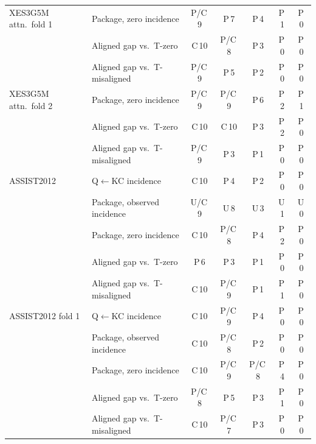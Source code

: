 \begin{table}[tbp]
\begin{tabular}{@{}llccccc@{}}
\addlinespace
XES3G5M attn.\ fold 1 & Package, zero incidence & P/C\,9 & P\,7 & P\,4 & P\,1 & P\,0 \\
 & Aligned gap vs.\ T-zero & C\,10 & P/C\,8 & P\,3 & P\,0 & P\,0 \\
 & Aligned gap vs.\ T-misaligned & P/C\,9 & P\,5 & P\,2 & P\,0 & P\,0 \\
\addlinespace
XES3G5M attn.\ fold 2 & Package, zero incidence & P/C\,9 & P/C\,9 & P\,6 & P\,2 & P\,1 \\
 & Aligned gap vs.\ T-zero & C\,10 & C\,10 & P\,3 & P\,2 & P\,0 \\
 & Aligned gap vs.\ T-misaligned & P/C\,9 & P\,3 & P\,1 & P\,0 & P\,0 \\
\addlinespace
ASSIST2012 & Q$\leftarrow$KC incidence & C\,10 & P\,4 & P\,2 & P\,0 & P\,0 \\
 & Package, observed incidence & U/C\,9 & U\,8 & U\,3 & U\,1 & U\,0 \\
 & Package, zero incidence & C\,10 & P/C\,8 & P\,4 & P\,2 & P\,0 \\
 & Aligned gap vs.\ T-zero & P\,6 & P\,3 & P\,1 & P\,0 & P\,0 \\
 & Aligned gap vs.\ T-misaligned & C\,10 & P/C\,9 & P\,1 & P\,1 & P\,0 \\
\addlinespace
ASSIST2012 fold 1 & Q$\leftarrow$KC incidence & C\,10 & P/C\,9 & P\,4 & P\,0 & P\,0 \\
 & Package, observed incidence & C\,10 & P/C\,8 & P\,2 & P\,0 & P\,0 \\
 & Package, zero incidence & C\,10 & P/C\,9 & P/C\,8 & P\,4 & P\,0 \\
 & Aligned gap vs.\ T-zero & P/C\,8 & P\,5 & P\,3 & P\,1 & P\,0 \\
 & Aligned gap vs.\ T-misaligned & C\,10 & P/C\,7 & P\,3 & P\,0 & P\,0 \\
\bottomrule
\end{tabular}
\end{table}

